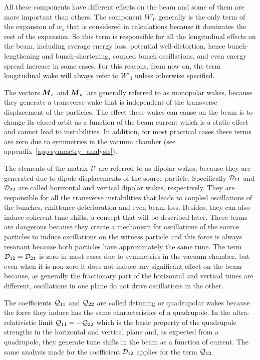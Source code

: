     All these components have different effects on the beam and some of them are more important than others. The component $W'_0$ generally is the only term of the expansion of $w_s$ that is considered in calculations because it dominates the rest of the expansion. So this term is responsible for all the longitudinal effects on the beam, including average energy loss, potential well-distortion, hence bunch-lengthening and bunch-shortening, coupled bunch oscillations, and even energy spread increase in some cases. For this reasons, from now on, the term longitudinal wake will always refer to $W'_0$ unless otherwise specified.

    The vectors $\boldsymbol{M}_s$ and $\boldsymbol{M}_w$ are generally referred to as monopolar wakes, because they generate a transverse wake that is independent of the transverse displacement of the particles. The effect these wakes can cause on the beam is to change its closed orbit as a function of the beam current which is a static effect and cannot lead to instabilities. In addition, for most practical cases these terms are zero due to symmetries in the vacuum chamber (see appendix~\ref{app:symmetry_analysis}).

    The elements of the matrix $\mathcal{D}$ are referred to as dipolar wakes, because they are generated due to dipole displacements of the source particle. Specifically $\mathcal{D}_{11}$ and $\mathcal{D}_{22}$ are called horizontal and vertical dipolar wakes, respectively. They are responsible for all the transverse instabilities that leads to coupled oscillations of the bunches, emittance deterioration and even beam loss. Besides, they can also induce coherent tune shifts, a concept that will be described later. These terms are dangerous because they create a mechanism for oscillations of the source particles to induce oscillations on the witness particle and this force is always resonant because both particles have approximately the same tune. The term $\mathcal{D}_{12}=\mathcal{D}_{21}$ is zero in most cases due to symmetries in the vacuum chamber, but even when it is non-zero it does not induce any significant effect on the beam because, as generally the fractionary part of the horizontal and vertical tunes are different, oscillations in one plane do not drive oscillations in the other.

    The coefficients $\mathcal{Q}_{11}$ and $\mathcal{Q}_{22}$ are called detuning or quadrupolar wakes because the force they induce has the same characteristics of a quadrupole. In the ultra-relativistic limit $\mathcal{Q}_{11}=-\mathcal{Q}_{22}$ which is the basic property of the quadrupole strengths in the horizontal and vertical plane and, as expected from a quadrupole, they generate tune shifts in the beam as a function of current. The same analysis made for the coefficient $\mathcal{D}_{12}$ applies for the term $\mathcal{Q}_{12}$.

